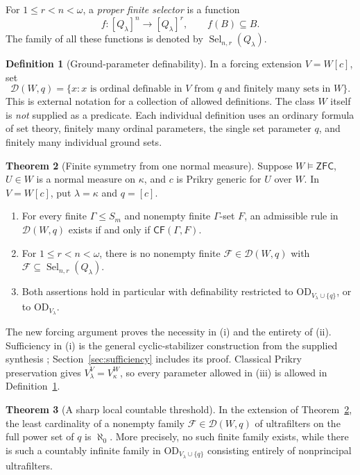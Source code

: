 \documentclass[11pt,letterpaper]{article}
\theoremstyle{definition}
\newtheorem{definition}{Definition}[section]
\newtheorem{theorem}[definition]{Theorem}
\numberwithin{equation}{section}
\newcommand{\ZFC}{\mathsf{ZFC}}
\newcommand{\OD}{\mathrm{OD}}
\newcommand{\Sel}{\operatorname{Sel}}
\newcommand{\CF}{\mathsf{CF}}
\newcommand{\DD}{\mathscr D}
\begin{document}
For $1\leq r<n<\omega$, a \emph{proper finite selector} is a function
\[
 f:[Q_\lambda]^n\longrightarrow[Q_\lambda]^r,
 \qquad f(B)\subseteq B.
\]
The family of all these functions is denoted by $\Sel_{n,r}(Q_\lambda)$.

\begin{definition}[Ground-parameter definability]\label{def:groundOD}
In a forcing extension $V=W[c]$, set
\[
 \DD(W,q)=\{x:x\text{ is ordinal definable in }V
       \text{ from }q\text{ and finitely many sets in }W\}.
\]
This is external notation for a collection of allowed definitions. The class $W$ itself is \emph{not} supplied as a predicate. Each individual definition uses an ordinary formula of set theory, finitely many ordinal parameters, the single set parameter $q$, and finitely many individual ground sets.
\end{definition}

\begin{theorem}[Finite symmetry from one normal measure]\label{thm:main}
Suppose $W\models\ZFC$, $U\in W$ is a normal measure on $\kappa$, and $c$ is Prikry generic for $U$ over $W$. In $V=W[c]$, put $\lambda=\kappa$ and $q=[c]$.
\begin{enumerate}[label=(\roman*)]
\item For every finite $\Gamma\leq S_m$ and nonempty finite $\Gamma$-set $F$, an admissible rule in $\DD(W,q)$ exists if and only if $\CF(\Gamma,F)$.
\item For $1\leq r<n<\omega$, there is no nonempty finite $\mathcal F\in\DD(W,q)$ with $\mathcal F\subseteq\Sel_{n,r}(Q_\lambda)$.
\item Both assertions hold in particular with definability restricted to $\OD_{V_\lambda\cup\{q\}}$, or to $\OD_{V_\lambda}$.
\end{enumerate}
\end{theorem}

The new forcing argument proves the necessity in (i) and the entirety of (ii). Sufficiency in (i) is the general cyclic-stabilizer construction from the supplied synthesis \cite[section ``The exact finite-label classification'']{synthesis}; Section~\ref{sec:sufficiency} includes its proof. Classical Prikry preservation gives $V_\lambda^V=V_\kappa^W$, so every parameter allowed in (iii) is allowed in Definition~\ref{def:groundOD}.

\begin{theorem}[A sharp local countable threshold]\label{thm:localmain}
In the extension of Theorem~\ref{thm:main}, the least cardinality of a nonempty family $\mathcal F\in\DD(W,q)$ of ultrafilters on the full power set of $q$ is $\aleph_0$. More precisely, no such finite family exists, while there is such a countably infinite family in $\OD_{V_\lambda\cup\{q\}}$ consisting entirely of nonprincipal ultrafilters.
\end{theorem}
\end{document}
